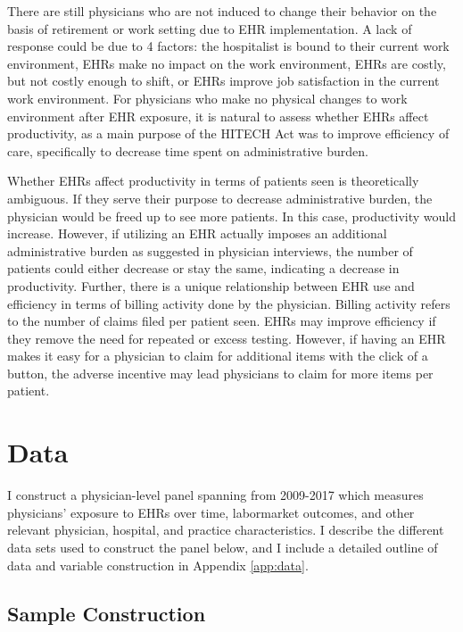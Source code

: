 \documentclass[12pt]{article}
\begin{document}
There are still physicians who are not induced to change their behavior on the basis of retirement or work setting due to EHR implementation. A lack of response could be due to 4 factors: the hospitalist is bound to their current work environment, EHRs make no impact on the work environment, EHRs are costly, but not costly enough to shift, or EHRs improve job satisfaction in the current work environment. For physicians who make no physical changes to work environment after EHR exposure, it is natural to assess whether EHRs affect productivity, as a main purpose of the HITECH Act was to improve efficiency of care, specifically to decrease time spent on administrative burden. 

Whether EHRs affect productivity in terms of patients seen is theoretically ambiguous. If they serve their purpose to decrease administrative burden, the physician would be freed up to see more patients. In this case, productivity would increase. However, if utilizing an EHR actually imposes an additional administrative burden as suggested in physician interviews, the number of patients could either decrease or stay the same, indicating a decrease in productivity. Further, there is a unique relationship between EHR use and efficiency in terms of billing activity done by the physician. Billing activity refers to the number of claims filed per patient seen. EHRs may improve efficiency if they remove the need for repeated or excess testing. However, if having an EHR makes it easy for a physician to claim for additional items with the click of a button, the adverse incentive may lead physicians to claim for more items per patient.




\section{Data}\label{sec:data}

I construct a physician-level panel spanning from 2009-2017 which measures physicians' exposure to EHRs over time, labormarket outcomes, and other relevant physician, hospital, and practice characteristics. I describe the different data sets used to construct the panel below, and I include a detailed outline of data and variable construction in Appendix \ref{app:data}.

\subsection{Sample Construction}
\end{document}
